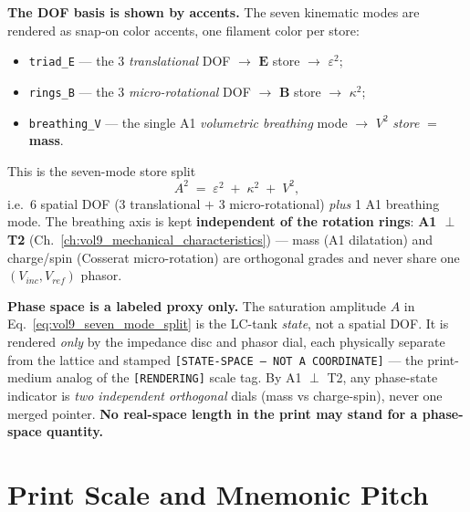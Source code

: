\textbf{The DOF basis is shown by accents.} The seven kinematic modes are rendered as snap-on color accents, one filament color per store:
\begin{itemize}
    \item \texttt{triad\_E} --- the 3 \emph{translational} DOF $\to$ $\mathbf{E}$ store $\to$ $\varepsilon^2$;
    \item \texttt{rings\_B} --- the 3 \emph{micro-rotational} DOF $\to$ $\mathbf{B}$ store $\to$ $\kappa^2$;
    \item \texttt{breathing\_V} --- the single A1 \emph{volumetric breathing} mode $\to$ $V^2$ \emph{store} $=$ \textbf{mass}.
\end{itemize}
This is the seven-mode store split
\begin{equation}
A^2 \;=\; \varepsilon^2 \;+\; \kappa^2 \;+\; V^2,
\label{eq:vol9_seven_mode_split}
\end{equation}
i.e.\ 6 spatial DOF (3 translational $+$ 3 micro-rotational) \emph{plus} 1 A1 breathing mode. The breathing axis is kept \textbf{independent of the rotation rings}: \textbf{A1 $\perp$ T2} (Ch.~\ref{ch:vol9_mechanical_characteristics}) --- mass (A1 dilatation) and charge/spin (Cosserat micro-rotation) are orthogonal grades and never share one $(V_{inc}, V_{ref})$ phasor.

\textbf{Phase space is a labeled proxy only.} The saturation amplitude $A$ in Eq.~\ref{eq:vol9_seven_mode_split} is the LC-tank \emph{state}, not a spatial DOF. It is rendered \emph{only} by the impedance disc and phasor dial, each physically separate from the lattice and stamped \texttt{[STATE-SPACE --- NOT A COORDINATE]} --- the print-medium analog of the \texttt{[RENDERING]} scale tag. By A1 $\perp$ T2, any phase-state indicator is \emph{two independent orthogonal} dials (mass vs charge-spin), never one merged pointer. \textbf{No real-space length in the print may stand for a phase-space quantity.}

\section{Print Scale and Mnemonic Pitch}
\label{sec:vol9_exp_prints_scale}

